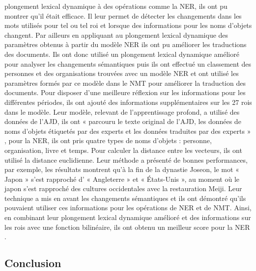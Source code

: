 \documentclass{article}
\begin{document}
plongement lexical dynamique à des opérations comme la NER, ils ont pu montrer qu’il était efficace. Il leur permet de détecter les changements dans les mots utilisés pour tel ou tel roi et lorsque des informations pour les noms d’objets changent. Par ailleurs en appliquant au plongement lexical dynamique des paramètres obtenus à partir du modèle NER ils ont pu améliorer les traductions des documents. Ils ont donc utilisé un plongement lexical dynamique amélioré pour analyser les changements sémantiques puis ils ont effectué un classement des personnes et des organisations trouvées avec un modèle NER et ont utilisé les paramètres formés par ce modèle dans le NMT pour améliorer la traduction des documents. Pour disposer d’une meilleure réflexion sur les informations pour les différentes périodes, ils ont ajouté des informations supplémentaires sur les 27 rois dans le modèle. Leur modèle, relevant de l’apprentissage profond, a utilisé des données de l’AJD, ils ont « parcouru le texte original de l’AJD, les données de noms d’objets étiquetés par des experts et les données traduites par des experts » \cite{jin2020korean}, pour la NER, ils ont pris quatre types de noms d’objets : personne, organisation, livre et temps. Pour calculer la distance entre les vecteurs, ils ont utilisé la distance euclidienne. Leur méthode a présenté de bonnes performances, par exemple, les résultats montrent qu’à la fin de la dynastie Joseon, le mot « Japon » s’est rapproché d’ « Angleterre » et « États-Unis », au moment où le japon s’est rapproché des cultures occidentales avec la restauration Meiji. Leur technique a mis en avant les changements sémantiques et ils ont démontré qu’ils pouvaient utiliser ces informations pour les opérations de NER et de NMT. Ainsi, en combinant leur plongement lexical dynamique amélioré et des informations sur les rois avec une fonction bilinéaire, ils ont obtenu un meilleur score pour la NER \cite{jin2020korean}.
\subsection{Conclusion}
\end{document}
